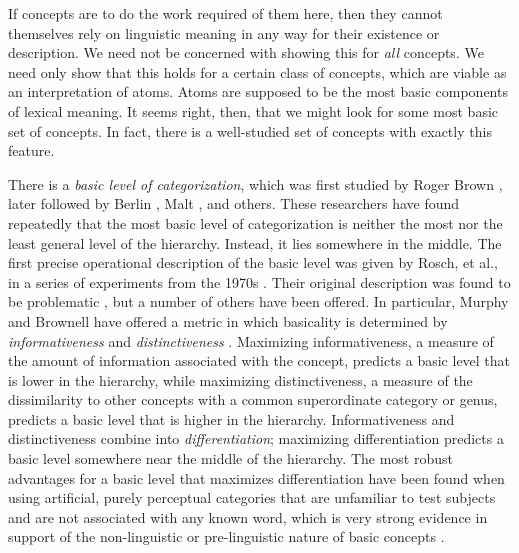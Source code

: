 If concepts are to do the work required of them here, then they cannot themselves rely on linguistic meaning in any way for their existence or description. We need not be concerned with showing this for \emph{all} concepts. We need only show that this holds for a certain class of concepts, which are viable as an interpretation of atoms. Atoms are supposed to be the most basic components of lexical meaning. It seems right, then, that we might look for some most basic set of concepts. In fact, there is a well-studied set of concepts with exactly this feature.

There is a \emph{basic level of categorization}, which was first studied by Roger Brown \cite{brown_how_1958}, later followed by Berlin \cite{berlin_ethnobiological_1992}, Malt \cite{malt_category_1995}, and others. These researchers have found repeatedly that the most basic level of categorization is neither the most nor the least general level of the hierarchy. Instead, it lies somewhere in the middle. The first precise operational description of the basic level was given by Rosch, et al., in a series of experiments from the 1970s \cite{rosch_structural_1976} \cite{rosch_principles_1978}. Their original description was found to be problematic \cite{murphy_cue_1982}, but a number of others have been offered. In particular, Murphy and Brownell have offered a metric in which basicality is determined by \emph{informativeness} and \emph{distinctiveness} \cite{murphy_category_1985}. Maximizing informativeness, a measure of the amount of information associated with the concept, predicts a basic level that is lower in the hierarchy, while maximizing distinctiveness, a measure of the dissimilarity to other concepts with a common superordinate category or genus, predicts a basic level that is higher in the hierarchy. Informativeness and distinctiveness combine into \emph{differentiation}; maximizing differentiation predicts a basic level somewhere near the middle of the hierarchy. The most robust advantages for a basic level that maximizes differentiation have been found when using artificial, purely perceptual categories that are unfamiliar to test subjects and are not associated with any known word, which is very strong evidence in support of the non-linguistic or pre-linguistic nature of basic concepts \cite[pg. 220]{murphy_big_2002}.

